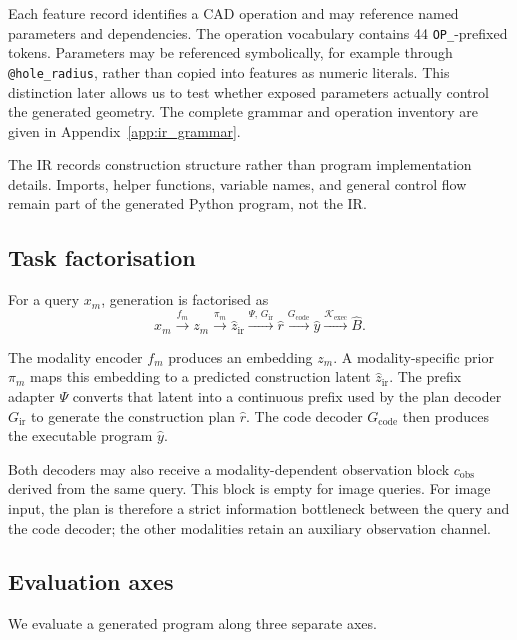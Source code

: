 \documentclass[preprint,12pt]{elsarticle}
\begin{document}
Each feature record identifies a CAD operation and may reference named
parameters and dependencies. The operation vocabulary contains 44
\texttt{OP\_}-prefixed tokens. Parameters may be referenced symbolically, for
example through \texttt{@hole\_radius}, rather than copied into features as
numeric literals. This distinction later allows us to test whether exposed
parameters actually control the generated geometry. The complete grammar and
operation inventory are given in Appendix~\ref{app:ir_grammar}.

The IR records construction structure rather than program implementation
details. Imports, helper functions, variable names, and general control flow
remain part of the generated Python program, not the IR.

\subsection{Task factorisation}
\label{sec:task_factorisation}

For a query $x_m$, generation is factorised as
\begin{equation}
  x_m
  \xrightarrow{f_m}
  z_m
  \xrightarrow{\pi_m}
  \hat{z}_{\mathrm{ir}}
  \xrightarrow{\Psi,\,G_{\mathrm{ir}}}
  \hat{r}
  \xrightarrow{G_{\mathrm{code}}}
  \hat{y}
  \xrightarrow{\mathcal{K}_{\mathrm{exec}}}
  \hat{B}.
\end{equation}

The modality encoder $f_m$ produces an embedding $z_m$. A modality-specific
prior $\pi_m$ maps this embedding to a predicted construction latent
$\hat{z}_{\mathrm{ir}}$. The prefix adapter $\Psi$ converts that latent into a
continuous prefix used by the plan decoder $G_{\mathrm{ir}}$ to generate the
construction plan $\hat{r}$. The code decoder $G_{\mathrm{code}}$ then produces
the executable program $\hat{y}$.

Both decoders may also receive a modality-dependent observation block
$c_{\mathrm{obs}}$ derived from the same query. This block is empty for image
queries. For image input, the plan is therefore a strict information
bottleneck between the query and the code decoder; the other modalities retain
an auxiliary observation channel.

\subsection{Evaluation axes}
\label{sec:evaluation_axes}

We evaluate a generated program along three separate axes.
\end{document}
